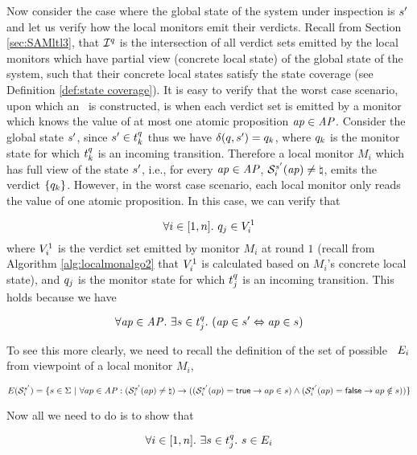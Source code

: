 Now consider the case where the global state of the system under inspection is $s'$ and let us verify how the local monitors emit their verdicts. Recall from Section \ref{sec:SAMltl3}, that $\mathcal{I}^q$ is the intersection of all verdict sets emitted by the local monitors which have partial view (concrete local state) of the global state of the system, such that their concrete local states satisfy the state coverage (see Definition \ref{def:state coverage}). It is easy to verify that the worst case scenario, upon which an \Exltl~is constructed, is when each verdict set is emitted by a monitor which knows the value of at most one atomic proposition $\mathit{ap} \in \mathit{AP}$. Consider the global state $s'$, since $s' \in t_k^q$ thus we have $\delta(q, s') = q_k$, where $q_k$ is the monitor state for which $t_k^q$ is an incoming transition.  Therefore a local monitor $M_i$ which has full view of the state $s'$, i.e., for every $\mathit{ap} \in \mathit{AP}$, $\mathcal{S}_i^{s'}(\mathit{ap}) \neq \natural$, emits the verdict $\{q_k\}$. However, in the worst case scenario, each local monitor only reads the value of one atomic proposition. In this case, we can verify that

 $$\forall i \in [1, n].~ q_j \in V_i^1$$ where $V_i^1$ is the verdict set emitted by monitor $M_i$ at round $1$ (recall from Algorithm \ref{alg:localmonalgo2} that $V_i^1$ is calculated based on $M_i$'s concrete local state), and $q_j$ is the monitor state for which $t_j^q$ is an incoming transition. This holds because we have 

$$ \forall \mathit{ap} \in \mathit{AP}.~ \exists s \in t_j^q. ~(\mathit{ap} \in s' \Leftrightarrow \mathit{ap} \in s) $$

To see this more clearly, we need to recall the definition of the set of possible \events~$E_i$ from viewpoint of a local monitor $M_i$,

\begin{center}
$E(\mathcal{S}_i^{s'}) = \{ s \in \Sigma ~|~ \forall ap \in \mathit{AP}: (\mathcal{S}_i^{s'}(ap) \neq \natural) \rightarrow ( (\mathcal{S}_i^{s'}(ap) = \mathsf{true} \rightarrow ap \in s) \wedge  (\mathcal{S}_i^{s'}(ap) = \mathsf{false} \rightarrow ap \notin s) ) \} $
\end{center}

Now all we need to do is to show that

$$\forall i \in [1, n].~ \exists s \in t_j^q . ~ s \in E_i$$
 
